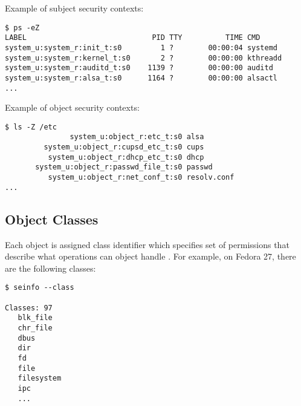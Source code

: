 Example of subject security contexts:
\begin{lstlisting}
$ ps -eZ
LABEL                             PID TTY          TIME CMD
system_u:system_r:init_t:s0         1 ?        00:00:04 systemd
system_u:system_r:kernel_t:s0       2 ?        00:00:00 kthreadd
system_u:system_r:auditd_t:s0    1139 ?        00:00:00 auditd
system_u:system_r:alsa_t:s0      1164 ?        00:00:00 alsactl
...
\end{lstlisting}

Example of object security contexts:
\begin{lstlisting}
$ ls -Z /etc
               system_u:object_r:etc_t:s0 alsa
         system_u:object_r:cupsd_etc_t:s0 cups
          system_u:object_r:dhcp_etc_t:s0 dhcp
       system_u:object_r:passwd_file_t:s0 passwd
          system_u:object_r:net_conf_t:s0 resolv.conf
...
\end{lstlisting}

\subsection{Object Classes}

Each object is assigned class identifier which specifies set of permissions that
describe what operations can object handle \cite[pp.~29--30]{tsn}. For example,
on Fedora 27, there are the following classes:
\begin{lstlisting}
$ seinfo --class

Classes: 97
   blk_file
   chr_file
   dbus
   dir
   fd
   file
   filesystem
   ipc
   ...
\end{lstlisting}

